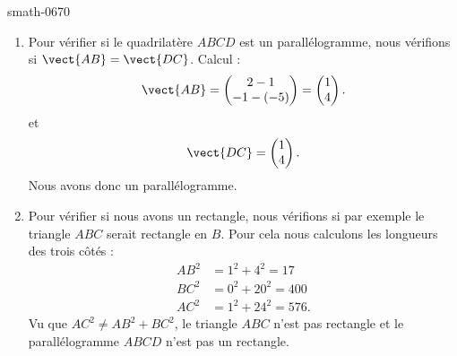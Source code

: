 
\begin{corrige}{smath-0670}

    \begin{enumerate}
        \item
            Pour vérifier si le quadrilatère \( ABCD\) est un parallélogramme, nous vérifions si \( \vect{ AB }=\vect{ DC }\). Calcul :
            \begin{equation}
                \vect{ AB }=\begin{pmatrix}
                    2-1    \\ 
                    -1-(-5)    
                \end{pmatrix}=\begin{pmatrix}
                    1    \\ 
                    4    
                \end{pmatrix}.
            \end{equation}
            et
            \begin{equation}
                \vect{ DC }=\begin{pmatrix}
                    1    \\ 
                    4    
                \end{pmatrix}.
            \end{equation}
            Nous avons donc un parallélogramme.
        \item
            Pour vérifier si nous avons un rectangle, nous vérifions si par exemple le triangle \( ABC\) serait rectangle en \( B\). Pour cela nous calculons les longueurs des trois côtés :
            \begin{subequations}
                \begin{align}
                    AB^2&=1^2+4^2=17\\
                    BC^2&=0^2+20^2=400\\
                    AC^2&=1^2+24^2=576.
                \end{align}
            \end{subequations}
            Vu que \( AC^2\neq AB^2+BC^2\), le triangle \( ABC\) n'est pas rectangle et le parallélogramme \( ABCD\) n'est pas un rectangle.


\end{enumerate}
\end{corrige}
